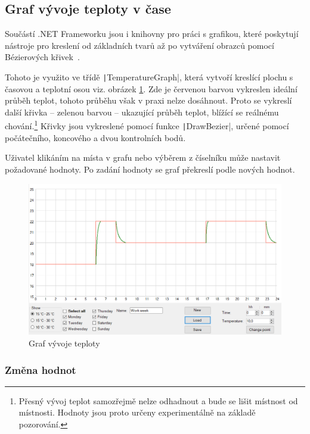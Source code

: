 \documentclass[thesis=B,czech]{FITthesis}[2012/10/20]
\begin{document}
\subsection{Graf vývoje teploty v čase}

Součástí .NET Frameworku jsou i knihovny pro práci s grafikou, které poskytují nástroje pro kreslení od základních tvarů až po vytváření obrazců pomocí Bézierových křivek~\cite{bezier}.

Tohoto je využito ve třídě \texttt|TemperatureGraph|, která vytvoří kreslící plochu s časovou a teplotní osou viz. obrázek \ref{fig:graf}. Zde je červenou barvou vykreslen ideální průběh teplot, tohoto průběhu však v praxi nelze dosáhnout. Proto se vykreslí další křivka – zelenou barvou – ukazující průběh teplot, blížící se reálnému chování.\footnote{Přesný vývoj teplot samozřejmě nelze odhadnout a bude se lišit místnost od místnosti. Hodnoty jsou proto určeny experimentálně na základě pozorování.} Křivky jsou vykreslené pomocí funkce  \texttt|DrawBezier|, určené pomocí počátečního, koncového a dvou kontrolních bodů. 

Uživatel klikáním na místa v grafu nebo výběrem z číselníku může nastavit požadované hodnoty. Po zadání hodnoty se graf překreslí podle nových hodnot.

\begin{figure}\centering
	\includegraphics[width=\textwidth]{diagrams/Graf}
	\caption[Graf vývoje teploty]{Graf vývoje teploty}\label{fig:graf}
\end{figure}

\subsubsection{Změna hodnot}
\end{document}
